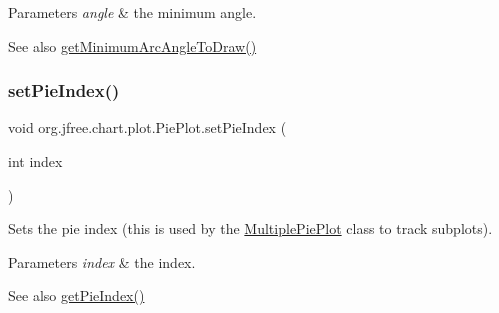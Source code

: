 \begin{DoxyParams}{Parameters}
{\em angle} & the minimum angle.\\
\hline
\end{DoxyParams}
\begin{DoxySeeAlso}{See also}
\mbox{\hyperlink{classorg_1_1jfree_1_1chart_1_1plot_1_1_pie_plot_a6effce452c78c1047deb15a8b0fd0c45}{get\+Minimum\+Arc\+Angle\+To\+Draw()}} 
\end{DoxySeeAlso}
\mbox{\label{classorg_1_1jfree_1_1chart_1_1plot_1_1_pie_plot_a9d05917a58c4ccab100f948d81f3d3be}} 
\subsubsection{\texorpdfstring{set\+Pie\+Index()}{setPieIndex()}}
{\footnotesize\ttfamily void org.\+jfree.\+chart.\+plot.\+Pie\+Plot.\+set\+Pie\+Index (\begin{DoxyParamCaption}\item[{int}]{index }\end{DoxyParamCaption})}

Sets the pie index (this is used by the \mbox{\hyperlink{classorg_1_1jfree_1_1chart_1_1plot_1_1_multiple_pie_plot}{Multiple\+Pie\+Plot}} class to track subplots).


\begin{DoxyParams}{Parameters}
{\em index} & the index.\\
\hline
\end{DoxyParams}
\begin{DoxySeeAlso}{See also}
\mbox{\hyperlink{classorg_1_1jfree_1_1chart_1_1plot_1_1_pie_plot_a455d67f5bfb17e8fbbd592ca573916fa}{get\+Pie\+Index()}} 
\end{DoxySeeAlso}
\mbox{\label{classorg_1_1jfree_1_1chart_1_1plot_1_1_pie_plot_a07d24c6dfd9bde2ec5db77a1bed07506}} 
